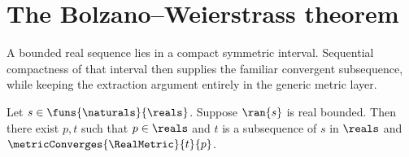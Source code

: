 \section{The Bolzano--Weierstrass theorem}





A bounded real sequence lies in a compact symmetric interval.  Sequential
compactness of that interval then supplies the familiar convergent
subsequence, while keeping the extraction argument entirely in the generic
metric layer.

\begin{theorem}\label{real_bolzano_weierstrass}
    Let $s\in\funs{\naturals}{\reals}$.
    Suppose $\ran{s}$ is real bounded.
    Then there exist $p,t$ such that $p\in\reals$ and
        $t$ is a subsequence of $s$ in $\reals$ and
        $\metricConverges{\RealMetric}{t}{p}$.
\end{theorem}
